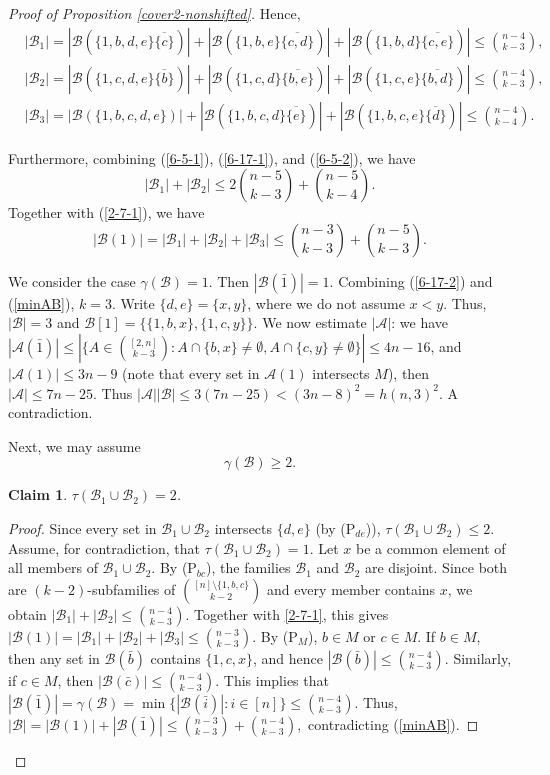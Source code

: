 \documentclass[a4paper,11pt]{article}
\newtheorem{claim}[theorem]{Claim}
\newcommand{\m}{\mathcal}
\begin{document}
\begin{proof}[Proof of Proposition \ref{cover2-nonshifted}]
Hence,
\begin{align}\label{2-7-3}
&|\m B_1|=|\m B(\{1,b, d,e\}\overline{\{c\}})|+|\m B(\{1,b, e\}\overline{\{c,d\}})|+|\m B(\{1,b, d\}\overline{\{c,e\}})|\le {n-4\choose k-3},\\ \label{2-7-4}
&|\m B_2|=|\m B(\{1,c, d,e\}\overline{\{b\}})|+|\m B(\{1,c, d\}\overline{\{b,e\}})|+|\m B(\{1,c, e\}\overline{\{b,d\}})|\le {n-4\choose k-3},\\ \label{2-7-1}
& |\m B_3|=|\m B(\{1,b,c, d,e\})|+|\m B(\{1,b,c, d\}\overline{\{e\}})|+|\m B(\{1,b,c, e\}\overline{\{d\}})|\le {n-4\choose k-4}.
\end{align}

Furthermore, combining (\ref{6-5-1}), (\ref{6-17-1}), and (\ref{6-5-2}), we have
\[
|\m B_1|+|\m B_2|\le 2{n-5\choose k-3}+{n-5\choose k-4}.
\]
Together with (\ref{2-7-1}), we have 
\begin{equation}\label{6-17-2}
|\m B(1)|=|\m B_1|+|\m B_2|+|\m B_3|\le {n-3\choose k-3}+{n-5\choose k-3}.
\end{equation}

We consider the case $\gamma(\m B)=1$. Then $|\m B(\bar1)|=1$.
Combining (\ref{6-17-2}) and (\ref{minAB}), $k=3$.
Write $\{d,e\}=\{x,y\}$, where we do not assume $x<y$.
Thus, $|\m B|=3$ and $\m B[1]=\{\{1,b,x\}, \{1,c,y\}\}$. 
We now estimate $|\m A|$: we have $|\m A(\bar1)|\le |\{A\in {[2,n]\choose k-3}: A\cap \{b,x\}\ne \emptyset, A\cap \{c,y\}\ne \emptyset\}|\le 4n-16$, and $|\m A(1)|\le 3n-9$ (note that every set in $\m A(1)$ intersects $M$), then $|\m A|\le 7n-25$. Thus $|\m A||\m B|\le 3(7n-25)<(3n-8)^2=h(n,3)^2$. A contradiction. 

Next, we may assume 
\[
\gamma(\m B)\ge 2.
\]


\begin{claim}\label{2-7-2}
    $\tau(\m B_1\cup \m B_2)= 2$.
\end{claim}
\begin{proof}
Since every set in $\m B_1\cup \m B_2$ intersects $\{d,e\}$ (by (P$_{de}$)), $\tau(\m B_1\cup \m B_2)\le 2$. 
Assume, for contradiction, that $\tau(\m B_1\cup \m B_2)=1$.
Let $x$ be a common element of all members of
$\mathcal B_1\cup\mathcal B_2$. 
By (P$_{bc}$), the families $\mathcal B_1$ and $\mathcal B_2$ are
disjoint. Since both are $(k-2)$-subfamilies of
${[n]\setminus\{1,b,c\}\choose k-2}$ and every member contains $x$, we
obtain $|\mathcal B_1|+|\mathcal B_2|
\le {n-4\choose k-3}.$
Together with \eqref{2-7-1}, this gives
$|\m B(1)|=|\m B_1|+|\m B_2|+|\m B_3|\le {n-3\choose k-3}.$
By (P$_M$), $b\in M$ or $c\in M$. 
If $b\in M$, then any set in $\m B(\bar{b})$ contains $\{1,c,x\}$, and hence $|\m B(\bar{b})|\le {n-4\choose k-3}$.
Similarly, if $c\in M$, then $|\m B(\bar{c})|\le {n-4\choose k-3}$. This implies that 
$|\m B(\bar{1})|=\gamma(\m B)=\min \{|\m B(\bar i)|: i\in [n]\}\le {n-4\choose k-3}.$
Thus, 
$|\m B|=|\m B(1)|+|\m B(\bar{1})|\le {n-3\choose k-3}+{n-4\choose k-3},$ 
contradicting (\ref{minAB}). 
\end{proof}




\end{proof}
\end{document}
